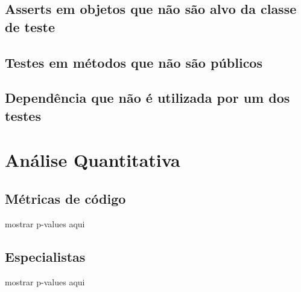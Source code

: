 \subsection{Asserts em objetos que não são alvo da classe de teste}

\subsection{Testes em métodos que não são públicos}

\subsection{Dependência que não é utilizada por um dos testes}

\section{Análise Quantitativa}

\subsection{Métricas de código}

mostrar p-values aqui

\subsection{Especialistas}

mostrar p-values aqui
